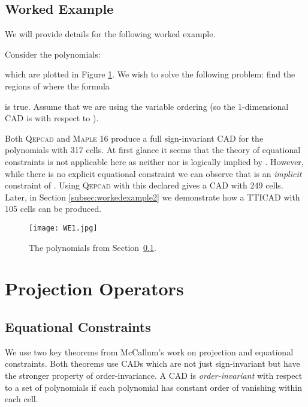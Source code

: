 \documentclass{article}
\begin{document}
\subsection{Worked Example}
\label{workedexample}

We will provide details for the following worked example.


\noindent Consider the polynomials:

which are plotted in Figure \ref{fig:workedexample1}.
We wish to solve the following problem: find the regions of  where the formula

is true.  Assume that we are using the variable ordering  (so the 1-dimensional CAD is with respect to ).

Both \textsc{Qepcad} \cite{Brown03} and \textsc{Maple} 16 \cite{Chenetal2009d} produce a full sign-invariant CAD for the polynomials with 317 cells.  At first glance it seems that the theory of equational constraints \cite{McCallum1999a,McCallum2001,BrownMcCallum2005} is not applicable here as neither  nor  is logically implied by .  However, while there is no explicit equational constraint we can observe that  is an {\em implicit} constraint of .  Using \textsc{Qepcad} with this declared gives a CAD with 249 cells.  Later, in Section \ref{subsec:workedexample2} we demonstrate how a TTICAD with 105 cells can be produced.

\begin{figure}
\caption{The polynomials from Section~\ref{workedexample}.}\label{fig:workedexample1}
\begin{center}
\texttt{[image: WE1.jpg]}
\end{center}
\vskip-20pt
\end{figure}



\section{Projection Operators}
\label{sec:Project}

\subsection{Equational Constraints}
\label{subsec:EC}

We use two key theorems from McCallum's work on projection and equational constraints.  Both theorems use CADs which are not just sign-invariant but have the stronger property of order-invariance.  A CAD is {\em order-invariant} with respect to a set of polynomials if each polynomial has constant order of vanishing within each cell.
\end{document}
